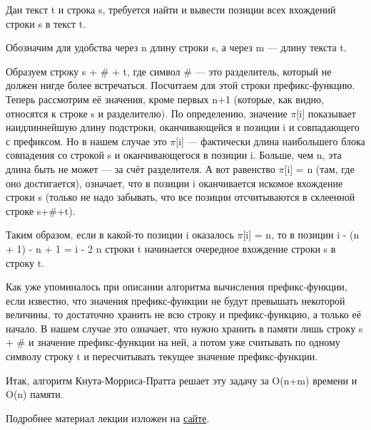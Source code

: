 Дан текст t и строка s, требуется найти и вывести позиции всех вхождений строки s в текст t.

Обозначим для удобства через n длину строки s, а через m — длину текста t.

Образуем строку s + \# + t, где символ \# — это разделитель, который не должен нигде более встречаться. Посчитаем для этой строки префикс-функцию. Теперь рассмотрим её значения, кроме первых n+1 (которые, как видно, относятся к строке s и разделителю). По определению, значение $\pi$[i] показывает наидлиннейшую длину подстроки, оканчивающейся в позиции i и совпадающего с префиксом. Но в нашем случае это $\pi$[i] — фактически длина наибольшего блока совпадения со строкой s и оканчивающегося в позиции i. Больше, чем n, эта длина быть не может — за счёт разделителя. А вот равенство $\pi$[i] = n (там, где оно достигается), означает, что в позиции i оканчивается искомое вхождение строки s (только не надо забывать, что все позиции отсчитываются в склеенной строке s+\#+t).

Таким образом, если в какой-то позиции i оказалось $\pi$[i] = n, то в позиции i - (n + 1) - n + 1 = i - 2 n строки t начинается очередное вхождение строки s в строку t.

Как уже упоминалось при описании алгоритма вычисления префикс-функции, если известно, что значения префикс-функции не будут превышать некоторой величины, то достаточно хранить не всю строку и префикс-функцию, а только её начало. В нашем случае это означает, что нужно хранить в памяти лишь строку s + \# и значение префикс-функции на ней, а потом уже считывать по одному символу строку t и пересчитывать текущее значение префикс-функции.

Итак, алгоритм Кнута-Морриса-Пратта решает эту задачу за O(n+m) времени и O(n) памяти.

Подробнее материал лекции изложен на \href{http://e-maxx.ru/algo/prefix_function}{сайте}.